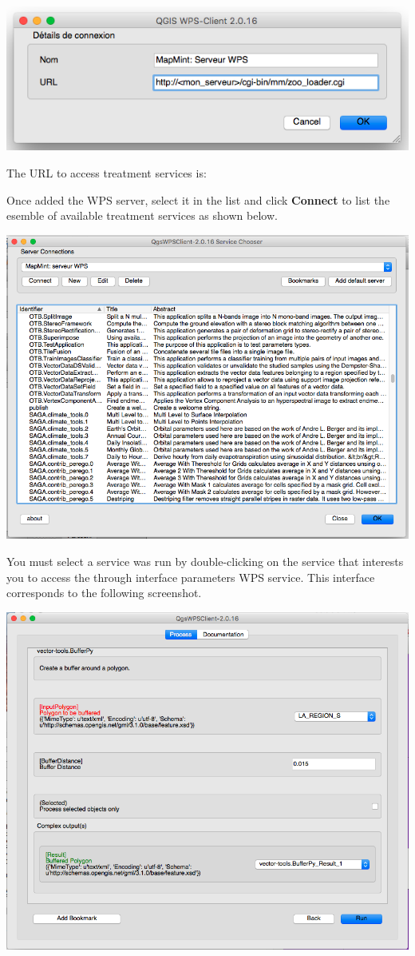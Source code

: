 \documentclass[letterpaper,10pt,english]{sphinxmanual}
\begin{document}
\includegraphics{qgis-wps.png}

The URL to access treatment services is:
\begin{quote}

\end{quote}

Once added the WPS server, select it in the list and click \textbf{Connect} to list the esemble of available treatment services as shown below.

\includegraphics{qgis-wps-gc.png}

You must select a service was run by double-clicking on the service that interests you to access the through interface parameters WPS service. This interface corresponds to the following screenshot.

\includegraphics{qgis-wps-buff.png}
\end{document}
